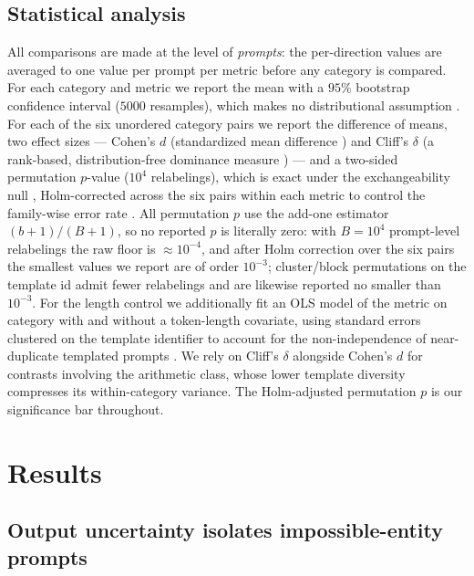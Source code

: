 \documentclass{article}
\begin{document}
\subsection{Statistical analysis}
\label{sec:methods-stats}

All comparisons are made at the level of \emph{prompts}: the per-direction values are averaged to
one value per prompt per metric before any category is compared. For each category and metric we
report the mean with a $95\%$ bootstrap confidence interval ($5000$ resamples), which makes no
distributional assumption \cite{efron1993introduction}. For each of the six unordered category
pairs we report the difference of means, two effect sizes --- Cohen's $d$ (standardized mean
difference \cite{cohen1988statistical}) and Cliff's $\delta$ (a rank-based, distribution-free
dominance measure \cite{cliff1993dominance}) --- and a two-sided permutation $p$-value ($10^4$
relabelings), which is exact under the exchangeability null \cite{ernst2004permutation},
Holm-corrected across the six pairs within each metric to control the family-wise error rate
\cite{holm1979simple}. All permutation $p$ use the add-one estimator $(b+1)/(B+1)$, so no reported $p$
is literally zero: with $B=10^4$ prompt-level relabelings the raw floor is $\approx\!10^{-4}$, and
after Holm correction over the six pairs the smallest values we report are of order $10^{-3}$;
cluster/block permutations on the template id admit fewer relabelings and are likewise reported no
smaller than $10^{-3}$. For the length control we additionally fit an OLS model of the metric on category
with and without a token-length covariate, using standard errors clustered on the template
identifier to account for the non-independence of near-duplicate templated prompts
\cite{cameron2015practitioner}. We rely on Cliff's $\delta$ alongside Cohen's $d$ for contrasts involving the
arithmetic class, whose lower template diversity compresses its within-category variance. The
Holm-adjusted permutation $p$ is our significance bar throughout.

\section{Results}
\label{sec:results}

\subsection{Output uncertainty isolates impossible-entity prompts}
\label{sec:results-output}
\end{document}
